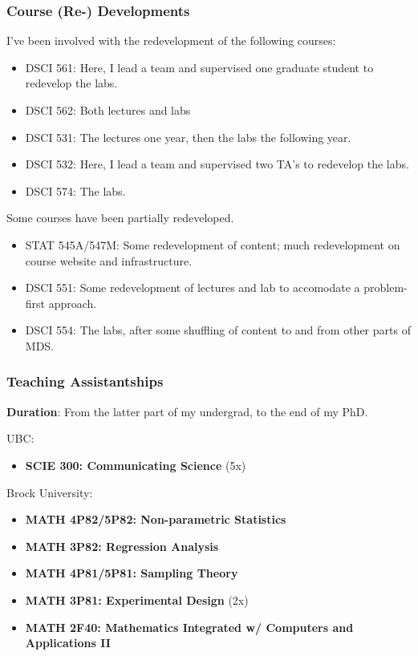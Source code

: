 \documentclass[]{article}
\providecommand{\tightlist}{%
  \setlength{\itemsep}{0pt}\setlength{\parskip}{0pt}}
\begin{document}
\hypertarget{course-re--developments}{%
\subsubsection{Course (Re-) Developments}\label{course-re--developments}}

I've been involved with the redevelopment of the following courses:

\begin{itemize}
\tightlist
\item
  DSCI 561: Here, I lead a team and supervised one graduate student to redevelop the labs.
\item
  DSCI 562: Both lectures and labs
\item
  DSCI 531: The lectures one year, then the labs the following year.
\item
  DSCI 532: Here, I lead a team and supervised two TA's to redevelop the labs.
\item
  DSCI 574: The labs.
\end{itemize}

Some courses have been partially redeveloped.

\begin{itemize}
\tightlist
\item
  STAT 545A/547M: Some redevelopment of content; much redevelopment on course website and infrastructure.
\item
  DSCI 551: Some redevelopment of lectures and lab to accomodate a problem-first approach.
\item
  DSCI 554: The labs, after some shuffling of content to and from other parts of MDS.
\end{itemize}

\hypertarget{teaching-assistantships}{%
\subsubsection{Teaching Assistantships}\label{teaching-assistantships}}

\textbf{Duration}: From the latter part of my undergrad, to the end of my PhD.

UBC:

\begin{itemize}
\tightlist
\item
  \textbf{SCIE 300: Communicating Science} (5x)
\end{itemize}

Brock University:

\begin{itemize}
\tightlist
\item
  \textbf{MATH 4P82/5P82: Non-parametric Statistics}
\item
  \textbf{MATH 3P82: Regression Analysis}
\item
  \textbf{MATH 4P81/5P81: Sampling Theory}
\item
  \textbf{MATH 3P81: Experimental Design} (2x)
\item
  \textbf{MATH 2F40: Mathematics Integrated w/ Computers and Applications II}
\end{itemize}
\end{document}
